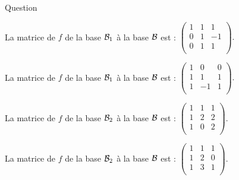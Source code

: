 \begin{multi}[multiple,feedback=
{La matrice de \(f\)  d'une base \( {\cal {B}}=(u_j)\) dans une  base \( {\cal {B}}'=(v_i)\) est la matrice  dont la \(j\)ième colonne est constituée des coordonnées de  \(f(u_j)\) dans la base \( {\cal {B}}'\). La matrice de \(f\) de la base \( {\cal {B}}_1\) à la base  \({\cal {B}}\)  est : \(
\left(\begin{array}{rcc}
1&0&0\\
1&1&1\\ 
1&-1&1\\
\end{array}\right).\)
\vskip0mm
La matrice de \(f\) de la base \( {\cal {B}}_2\) à la base  \({\cal {B}}\)  est : \(
\left(\begin{array}{rcc}
1&1&1\\
1&2&2\\ 
1&0&2\\
\end{array}\right).\)
}]{Question}
    \item La matrice de \(f\) de la base \( {\cal {B}}_1\) à la base  \({\cal {B}}\) est : \(
\left(\begin{array}{rcc}
1&1&1\\
0&1&-1\\
0&1&1\\
\end{array}\right).\)
    \item* La matrice de \(f\) de la base \( {\cal {B}}_1\) à la base  \({\cal {B}}\)  est : \(
\left(\begin{array}{rcc}
1&0&0\\
1&1&1\\
1&-1&1\\
\end{array}\right).\)
    \item* La matrice de \(f\) de la base \( {\cal {B}}_2\) à la base  \({\cal {B}}\)  est : \(
\left(\begin{array}{rcc}
1&1&1\\
1&2&2\\
1&0&2\\
\end{array}\right).\)
    \item La matrice de \(f\) de la base \( {\cal {B}}_2\) à la base  \({\cal {B}}\)  est : \(
\left(\begin{array}{rcc}
1&1&1\\
1&2&0\\
1&3&1\\
\end{array}\right).\)
\end{multi}


